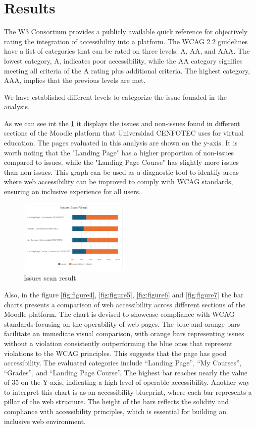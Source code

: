 \documentclass{IEEEtran}
\begin{document}
\section{Results}
The W3 Consortium provides a publicly available quick reference for objectively rating the integration of accessibility into a platform. The WCAG 2.2 guidelines have a list of categories that can be rated on three levels: A, AA, and AAA. The lowest category, A, indicates poor accessibility, while the AA category signifies meeting all criteria of the A rating plus additional criteria. The highest category, AAA, implies that the previous levels are met.

We have established different levels to categorize the issue founded in the analysis.

As we can see int the \ref{fig:figure3} it displays the issues and non-issues found in different sections of the Moodle platform that Universidad CENFOTEC uses for virtual education. The pages evaluated in this analysis are shown on the y-axis. It is worth noting that the "Landing Page" has a higher proportion of non-issues compared to issues, while the "Landing Page Course" has slightly more issues than non-issues. This graph can be used as a diagnostic tool to identify areas where web accessibility can be improved to comply with WCAG standards, ensuring an inclusive experience for all users.

\begin{figure}[H]
    \includegraphics[width=0.48\textwidth]{images/scanResult.png}
    \caption{Issues scan result}
    \label{fig:figure3}
\end{figure}


Also, in the figure \ref{fig:figure4}, \ref{fig:figure5}, \ref{fig:figure6} and \ref{fig:figure7} the bar charts presents a comparison of web accessibility across different sections of the Moodle platform. The chart is devised to showcase compliance with WCAG standards focusing on the operability of web pages. The blue and orange bars facilitate an immediate visual comparison, with orange bars representing issues without a violation consistently outperforming the blue ones that represent violations to the WCAG principles. This suggests that the page has good accessibility. The evaluated categories include “Landing Page”, “My Courses”, “Grades”, and “Landing Page Course”. The highest bar reaches nearly the value of 35 on the Y-axis, indicating a high level of operable accessibility. Another way to interpret this chart is as an accessibility blueprint, where each bar represents a pillar of the web structure. The height of the bars reflects the solidity and compliance with accessibility principles, which is essential for building an inclusive web environment.
\end{document}
